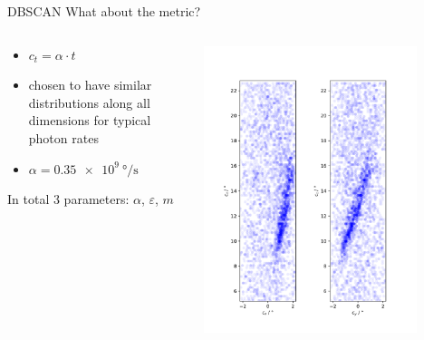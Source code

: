 \begin{frame}{DBSCAN}
  What about the metric?
  \vspace{-12mm}
  \begin{columns}[onlytextwidth]
    \begin{column}{0.475\textwidth}
      \begin{itemize}
        \item $c_t = \alpha\cdot t$
        \item chosen to have similar distributions along all dimensions for typical photon rates
        \item $\alpha = \SI{0,35e9}{\degree\per\second}$
      \end{itemize}
      \vspace{1cm}
      In total 3 parameters: $\alpha$, $\varepsilon$, $m$
    \end{column}
    \begin{column}{0.475\textwidth}
      \includegraphics[width=0.82\textwidth]{fig/point_cloud.pdf}
    \end{column}
  \end{columns}
\end{frame}

